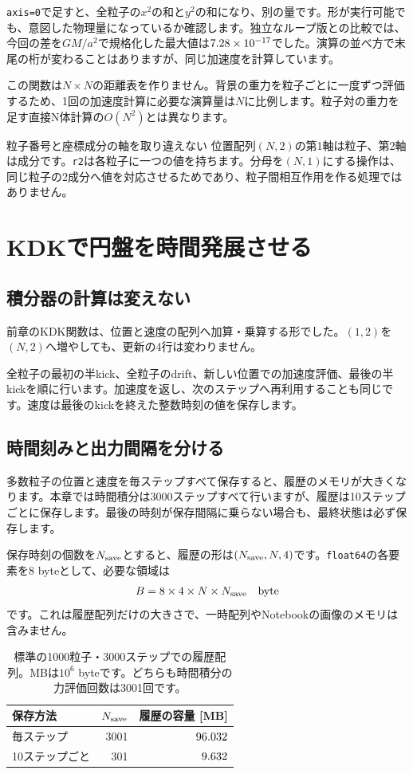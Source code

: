 \texttt{axis=0}で足すと、全粒子の$x^2$の和と$y^2$の和になり、別の量です。形が実行可能でも、意図した物理量になっているか確認します。独立なループ版との比較では、今回の差を$GM/a^2$で規格化した最大値は$7.28\times 10^{-17}$でした。演算の並べ方で末尾の桁が変わることはありますが、同じ加速度を計算しています。

この関数は$N\times N$の距離表を作りません。背景の重力を粒子ごとに一度ずつ評価するため、1回の加速度計算に必要な演算量は$N$に比例します。粒子対の重力を足す直接N体計算の$O(N^2)$とは異なります。

\begin{failbox}{粒子番号と座標成分の軸を取り違えない}
位置配列$(N,2)$の第1軸は粒子、第2軸は成分です。\texttt{r2}は各粒子に一つの値を持ちます。分母を$(N,1)$にする操作は、同じ粒子の2成分へ値を対応させるためであり、粒子間相互作用を作る処理ではありません。
\end{failbox}

\section{KDKで円盤を時間発展させる}
\label{sec:ch4-integration}
\subsection{積分器の計算は変えない}
前章のKDK関数は、位置と速度の配列へ加算・乗算する形でした。$(1,2)$を$(N,2)$へ増やしても、更新の4行は変わりません。

全粒子の最初の半kick、全粒子のdrift、新しい位置での加速度評価、最後の半kickを順に行います。加速度を返し、次のステップへ再利用することも同じです。速度は最後のkickを終えた整数時刻の値を保存します。

\subsection{時間刻みと出力間隔を分ける}
多数粒子の位置と速度を毎ステップすべて保存すると、履歴のメモリが大きくなります。本章では時間積分は3000ステップすべて行いますが、履歴は10ステップごとに保存します。最後の時刻が保存間隔に乗らない場合も、最終状態は必ず保存します。

保存時刻の個数を$N_{\rm save}$とすると、履歴の形は$(N_{\rm save},N,4)$です。\texttt{float64}の各要素を8 byteとして、必要な領域は
\begin{equation}
B=8\times 4\times N\times N_{\rm save}\quad\mathrm{byte}
\label{eq:ch4-memory}
\end{equation}
です。これは履歴配列だけの大きさで、一時配列やNotebookの画像のメモリは含みません。
\begin{table}[htbp]
\centering\small
\caption{標準の1000粒子・3000ステップでの履歴配列。MBは$10^6$ byteです。どちらも時間積分の力評価回数は3001回です。}
\label{tab:ch4-memory}
\begin{tabular}{lrr}\toprule
保存方法 & $N_{\rm save}$ & 履歴の容量 [MB] \\\midrule
毎ステップ & 3001 & $96.032$ \\
10ステップごと & 301 & $9.632$ \\\bottomrule
\end{tabular}
\end{table}

